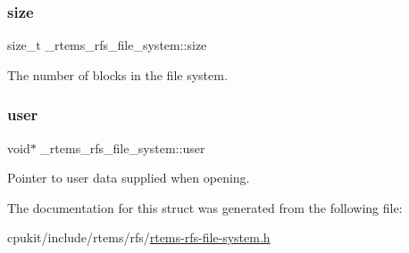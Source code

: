 \subsubsection{\texorpdfstring{size}{size}}
{\footnotesize\ttfamily size\+\_\+t \+\_\+rtems\+\_\+rfs\+\_\+file\+\_\+system\+::size}

The number of blocks in the file system. \mbox{\label{struct__rtems__rfs__file__system_a6364183c17498523181c336b38c28b91}} 
\subsubsection{\texorpdfstring{user}{user}}
{\footnotesize\ttfamily void$\ast$ \+\_\+rtems\+\_\+rfs\+\_\+file\+\_\+system\+::user}

Pointer to user data supplied when opening. 

The documentation for this struct was generated from the following file\+:\begin{DoxyCompactItemize}
\item 
cpukit/include/rtems/rfs/\mbox{\hyperlink{rtems-rfs-file-system_8h}{rtems-\/rfs-\/file-\/system.\+h}}\end{DoxyCompactItemize}
